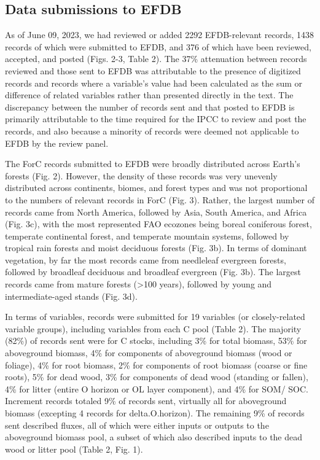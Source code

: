 \documentclass[, manuscript]{copernicus}
\begin{document}
\endgroup{}

\subsection{Data submissions to EFDB}

As of June 09, 2023, we had reviewed or added 2292 EFDB-relevant
records, 1438 records of which were submitted to EFDB, and 376 of which
have been reviewed, accepted, and posted (Figs. 2-3, Table 2). The 37\%
attenuation between records reviewed and those sent to EFDB was
attributable to the presence of digitized records and records where a
variable's value had been calculated as the sum or difference of related
variables rather than presented directly in the text. The discrepancy
between the number of records sent and that posted to EFDB is primarily
attributable to the time required for the IPCC to review and post the
records, and also because a minority of records were deemed not
applicable to EFDB by the review panel.

The ForC records submitted to EFDB were broadly distributed across
Earth's forests (Fig. 2). However, the density of these records was very
unevenly distributed across continents, biomes, and forest types and was
not proportional to the numbers of relevant records in ForC (Fig. 3).
Rather, the largest number of records came from North America, followed
by Asia, South America, and Africa (Fig. 3c), with the most represented
FAO ecozones being boreal coniferous forest, temperate continental
forest, and temperate mountain systems, followed by tropical rain
forests and moist deciduous forests (Fig. 3b). In terms of dominant
vegetation, by far the most records came from needleleaf evergreen
forests, followed by broadleaf deciduous and broadleaf evergreen (Fig.
3b). The largest records came from mature forests (\textgreater100
years), followed by young and intermediate-aged stands (Fig. 3d).

In terms of variables, records were submitted for 19 variables (or
closely-related variable groups), including variables from each C pool
(Table 2). The majority (82\%) of records sent were for C stocks,
including 3\% for total biomass, 53\% for aboveground biomass, 4\% for
components of aboveground biomass (wood or foliage), 4\% for root
biomass, 2\% for components of root biomass (coarse or fine roots), 5\%
for dead wood, 3\% for components of dead wood (standing or fallen), 4\%
for litter (entire O horizon or OL layer component), and 4\% for SOM/
SOC. Increment records totaled 9\% of records sent, virtually all for
aboveground biomass (excepting 4 records for delta.O.horizon). The
remaining 9\% of records sent described fluxes, all of which were either
inputs or outputs to the aboveground biomass pool, a subset of which
also described inputs to the dead wood or litter pool (Table 2, Fig. 1).
\end{document}
